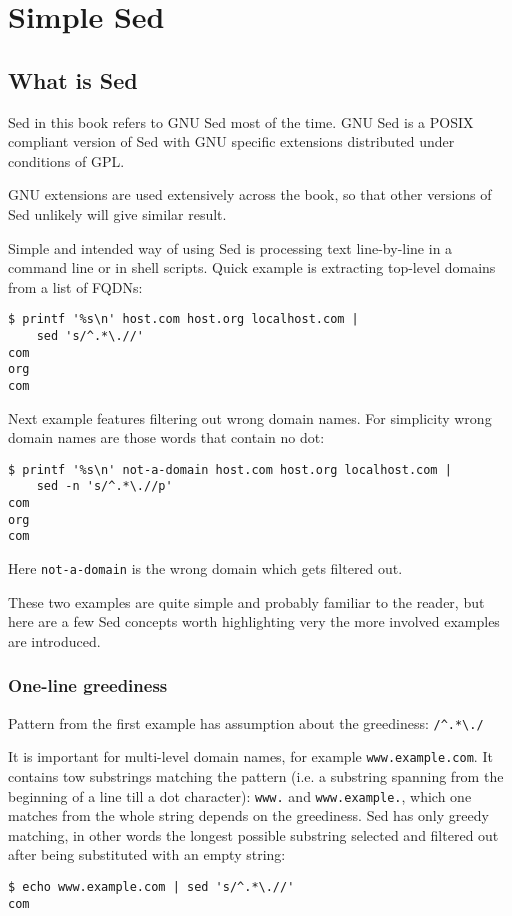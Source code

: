\chapter{Simple Sed}
\section{What is Sed}
Sed in this book refers to GNU Sed most of the time.
GNU Sed is a POSIX compliant version of Sed with GNU specific extensions
distributed under conditions of GPL.

GNU extensions are used extensively across the book, so that other
versions of Sed unlikely will give similar result.

Simple and intended way of using Sed is processing text line-by-line
in a command line or in shell scripts. Quick example is extracting top-level
domains from a list of FQDNs:

\begin{lstlisting}
$ printf '%s\n' host.com host.org localhost.com |
	sed 's/^.*\.//'
com
org
com
\end{lstlisting}

Next example features filtering out wrong domain names.
For simplicity wrong domain names are
those words that contain no dot:

\begin{lstlisting}[caption={Simple filtering},label={lst:simple-filtering}]
$ printf '%s\n' not-a-domain host.com host.org localhost.com |
	sed -n 's/^.*\.//p'
com
org
com
\end{lstlisting}

Here \lstinline{not-a-domain} is the wrong domain which gets filtered out.

These two examples are quite simple and probably familiar to the reader,
but here are a few Sed concepts worth highlighting very the more
involved examples are introduced.

\subsection{One-line greediness}

Pattern from the first example has assumption about the greediness:
\lstinline{/^.*\./}

It is important for multi-level domain names, for example \lstinline{www.example.com}.
It contains tow substrings matching the pattern (i.e. a substring spanning from the
beginning of a line till a dot character):
\lstinline{www.} and \lstinline{www.example.},
which one matches from the whole string depends on the greediness.
Sed has only greedy matching, in other words the longest possible
substring selected and filtered out after being substituted with an empty string:
\begin{lstlisting}[caption={Simple greedy matching}, label={lst:simple-greedy}]
$ echo www.example.com | sed 's/^.*\.//'
com
\end{lstlisting}

